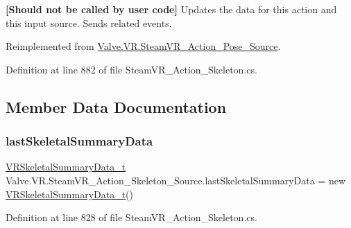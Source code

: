 {\bfseries{\mbox{[}Should not be called by user code\mbox{]}}} Updates the data for this action and this input source. Sends related events. 



Reimplemented from \mbox{\hyperlink{class_valve_1_1_v_r_1_1_steam_v_r___action___pose___source_a0254cddea71deac6f822536c4232a452}{Valve.\+V\+R.\+Steam\+V\+R\+\_\+\+Action\+\_\+\+Pose\+\_\+\+Source}}.



Definition at line 882 of file Steam\+V\+R\+\_\+\+Action\+\_\+\+Skeleton.\+cs.



\subsection{Member Data Documentation}
\mbox{\label{class_valve_1_1_v_r_1_1_steam_v_r___action___skeleton___source_a56cf3576253666dc4eaa5e9bca5b2936}} 
\subsubsection{\texorpdfstring{lastSkeletalSummaryData}{lastSkeletalSummaryData}}
{\footnotesize\ttfamily \mbox{\hyperlink{struct_valve_1_1_v_r_1_1_v_r_skeletal_summary_data__t}{V\+R\+Skeletal\+Summary\+Data\+\_\+t}} Valve.\+V\+R.\+Steam\+V\+R\+\_\+\+Action\+\_\+\+Skeleton\+\_\+\+Source.\+last\+Skeletal\+Summary\+Data = new \mbox{\hyperlink{struct_valve_1_1_v_r_1_1_v_r_skeletal_summary_data__t}{V\+R\+Skeletal\+Summary\+Data\+\_\+t}}()\hspace{0.3cm}{\ttfamily [protected]}}



Definition at line 828 of file Steam\+V\+R\+\_\+\+Action\+\_\+\+Skeleton.\+cs.

\mbox{\label{class_valve_1_1_v_r_1_1_steam_v_r___action___skeleton___source_a45e152296782a90488385f9e857432b1}} 
